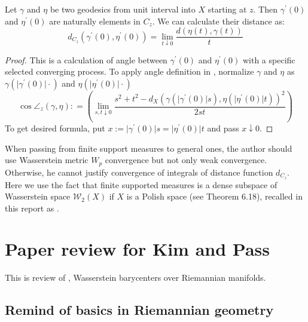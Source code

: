 \begin{thm}
	Let $\gamma$ and  $\eta$ be two geodesics from unit interval into $X$ starting at $z$. Then $\gamma^\prime(0)$ and $\eta^\prime(0)$ are naturally elements in $C_z$. We can calculate their distance as:
	\[  d_{C_z}(\gamma^\prime(0),\eta^\prime(0))=\lim _ { t \downarrow 0 } \frac  {d ( \eta ( t ) , \gamma ( t ) )  }{ t }\]
\end{thm}

\begin{proof}
	This is a calculation of angle between $\gamma^\prime(0)$ and $\eta^\prime(0)$ with a specific selected converging process. To apply angle definition in , normalize $\gamma$ and $\eta$ as $\gamma\left(\vert\gamma^\prime(0)\vert \cdot\right)$ and $\eta\left(\vert\eta^\prime(0)\vert \cdot\right)$
	\[
		\cos\angle _ { z } ( \gamma , \eta ): = \left( \lim _ { s , t \downarrow 0 } \frac { s ^ { 2 } + t ^ { 2 } - d _ { X }\left( \gamma (\vert \gamma^\prime(0)\vert s ) , \eta (\vert \eta^\prime(0)\vert  t ) \right) ^ { 2 } } { 2 s t } \right)
	\]
	To get desired formula, put $ x := \vert  \gamma^\prime(0)\vert s =\vert \eta^\prime(0)\vert t $ and pass $x \downarrow 0$.
\end{proof}

\begin{rmk}
	When passing from finite support measures to general ones, the author should use Wasserstein metric $W_p$ convergence but not only weak convergence. Otherwise, he cannot justify convergence of integrals of distance function $d_{C_z}$. Here we use the fact that finite supported measures is a dense subspace of Wasserstein space $\mathcal{W}_2(X)$ if $X$ is a Polish space (see \cite{villani2008optimal} Theorem 6.18), recalled in this report as .
\end{rmk}

\section{Paper review for Kim and Pass}

This is review of \cite{KIM2017640},
Wasserstein barycenters over Riemannian manifolds.

\subsection{Remind of basics in Riemannian geometry}

